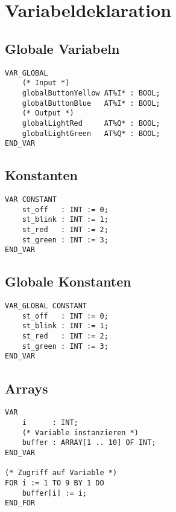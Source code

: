 


\section{Variabeldeklaration}

\subsection{Globale Variabeln}
\begin{lstlisting}
VAR_GLOBAL
    (* Input *)
    globalButtonYellow AT%I* : BOOL;
    globalButtonBlue   AT%I* : BOOL;
    (* Output *)
    globalLightRed     AT%Q* : BOOL;
    globalLightGreen   AT%Q* : BOOL;
END_VAR
\end{lstlisting}

\subsection{Konstanten}
\begin{lstlisting}
VAR CONSTANT
    st_off   : INT := 0;
    st_blink : INT := 1;
    st_red   : INT := 2;
    st_green : INT := 3;
END_VAR
\end{lstlisting}

\subsection{Globale Konstanten}
\begin{lstlisting}
VAR_GLOBAL CONSTANT
    st_off   : INT := 0;
    st_blink : INT := 1;
    st_red   : INT := 2;
    st_green : INT := 3;
END_VAR
\end{lstlisting}

\subsection{Arrays}
\begin{lstlisting}
VAR
    i      : INT;
    (* Variable instanzieren *)
    buffer : ARRAY[1 .. 10] OF INT;
END_VAR

(* Zugriff auf Variable *)
FOR i := 1 TO 9 BY 1 DO
    buffer[i] := i;
END_FOR
\end{lstlisting}
